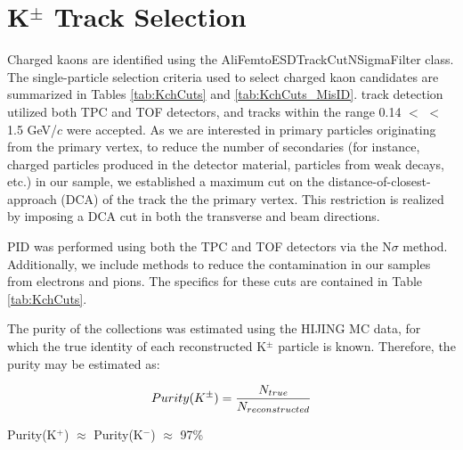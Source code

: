 \documentclass[/home/jesse/Analysis/FemtoAnalysis/AnalysisNotes/AnalysisNoteJBuxton.tex]{subfiles}
\begin{document}
\section{\texorpdfstring{K$^{\pm}$}{TEXT} Track Selection}
\label{KchTrackSelection}

Charged kaons are identified using the AliFemtoESDTrackCutNSigmaFilter class.
The single-particle selection criteria used to select charged kaon candidates are summarized in Tables \ref{tab:KchCuts} and \ref{tab:KchCuts_MisID}.
\Kpm track detection utilized both TPC and TOF detectors, and tracks within the range 0.14 $<$ \pt $<$ 1.5 GeV/$c$ were accepted.
As we are interested in primary particles originating from the primary vertex, to reduce the number of secondaries (for instance, charged particles produced in the detector material, particles from weak decays, etc.) in our sample, we established a maximum cut on the distance-of-closest-approach (DCA) of the track the the primary vertex.
This restriction is realized by imposing a DCA cut in both the transverse and beam directions.

PID was performed using both the TPC and TOF detectors via the $\mathrm{N}\sigma$ method.  
Additionally, we include methods to reduce the contamination in our \Kpm samples from electrons and pions.  
The specifics for these cuts are contained in Table \ref{tab:KchCuts}.

The purity of the \Kpm collections was estimated using the HIJING MC data, for which the true identity of each reconstructed K$^{\pm}$ particle is known.  Therefore, the purity may be estimated as:

\begin{equation}
 Purity(K^{\pm}) = \frac{N_{true}}{N_{reconstructed}} \\
\label{eqn:KchPurity}
\end{equation}

Purity(K$^{+}$) $\approx$ Purity(K$^{-}$) $\approx$ 97\%
\end{document}
